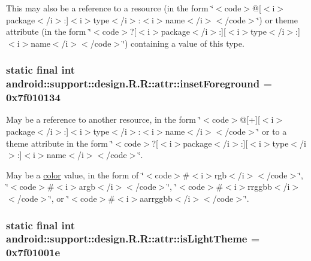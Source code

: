 This may also be a reference to a resource (in the form \char`\"{}$<$code$>$@\mbox{[}$<$i$>$package$<$/i$>$:\mbox{]}$<$i$>$type$<$/i$>$:$<$i$>$name$<$/i$>$$<$/code$>$\char`\"{}) or theme attribute (in the form \char`\"{}$<$code$>$?\mbox{[}$<$i$>$package$<$/i$>$:\mbox{]}\mbox{[}$<$i$>$type$<$/i$>$:\mbox{]}$<$i$>$name$<$/i$>$$<$/code$>$\char`\"{}) containing a value of this type. \hypertarget{classandroid_1_1support_1_1design_1_1_r_1_1attr_c5be1be6a7cef94485e09d844654426f}{
\subsubsection[{insetForeground}]{\setlength{\rightskip}{0pt plus 5cm}static final int android::support::design.R.R::attr::insetForeground = 0x7f010134}}
\label{classandroid_1_1support_1_1design_1_1_r_1_1attr_c5be1be6a7cef94485e09d844654426f}


May be a reference to another resource, in the form \char`\"{}$<$code$>$@\mbox{[}+\mbox{]}\mbox{[}$<$i$>$package$<$/i$>$:\mbox{]}$<$i$>$type$<$/i$>$:$<$i$>$name$<$/i$>$$<$/code$>$\char`\"{} or to a theme attribute in the form \char`\"{}$<$code$>$?\mbox{[}$<$i$>$package$<$/i$>$:\mbox{]}\mbox{[}$<$i$>$type$<$/i$>$:\mbox{]}$<$i$>$name$<$/i$>$$<$/code$>$\char`\"{}. 

May be a \hyperlink{classandroid_1_1support_1_1design_1_1_r_1_1color}{color} value, in the form of \char`\"{}$<$code$>$\#$<$i$>$rgb$<$/i$>$$<$/code$>$\char`\"{}, \char`\"{}$<$code$>$\#$<$i$>$argb$<$/i$>$$<$/code$>$\char`\"{}, \char`\"{}$<$code$>$\#$<$i$>$rrggbb$<$/i$>$$<$/code$>$\char`\"{}, or \char`\"{}$<$code$>$\#$<$i$>$aarrggbb$<$/i$>$$<$/code$>$\char`\"{}. \hypertarget{classandroid_1_1support_1_1design_1_1_r_1_1attr_efdcfe6c4cbd3ca7261440d3a2b0c78f}{
\subsubsection[{isLightTheme}]{\setlength{\rightskip}{0pt plus 5cm}static final int android::support::design.R.R::attr::isLightTheme = 0x7f01001e}}
\label{classandroid_1_1support_1_1design_1_1_r_1_1attr_efdcfe6c4cbd3ca7261440d3a2b0c78f}


